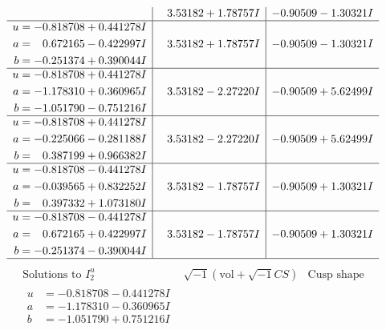 \documentclass[1p]{elsarticle_modified}
\theoremstyle{definition}
\newcommand{\I}{\sqrt{-1}}
\begin{document}
$$\begin{array}{c|c|c}
 & \phantom{-}3.53182 + 1.78757 I & -0.90509 - 1.30321 I \\ \hline\begin{aligned}
u &= -0.818708 + 0.441278 I \\
a &= \phantom{-}0.672165 - 0.422997 I \\
b &= -0.251374 + 0.390044 I\end{aligned}
 & \phantom{-}3.53182 + 1.78757 I & -0.90509 - 1.30321 I \\ \hline\begin{aligned}
u &= -0.818708 + 0.441278 I \\
a &= -1.178310 + 0.360965 I \\
b &= -1.051790 - 0.751216 I\end{aligned}
 & \phantom{-}3.53182 - 2.27220 I & -0.90509 + 5.62499 I \\ \hline\begin{aligned}
u &= -0.818708 + 0.441278 I \\
a &= -0.225066 - 0.281188 I \\
b &= \phantom{-}0.387199 + 0.966382 I\end{aligned}
 & \phantom{-}3.53182 - 2.27220 I & -0.90509 + 5.62499 I \\ \hline\begin{aligned}
u &= -0.818708 - 0.441278 I \\
a &= -0.039565 + 0.832252 I \\
b &= \phantom{-}0.397332 + 1.073180 I\end{aligned}
 & \phantom{-}3.53182 - 1.78757 I & -0.90509 + 1.30321 I \\ \hline\begin{aligned}
u &= -0.818708 - 0.441278 I \\
a &= \phantom{-}0.672165 + 0.422997 I \\
b &= -0.251374 - 0.390044 I\end{aligned}
 & \phantom{-}3.53182 - 1.78757 I & -0.90509 + 1.30321 I\\
 \hline 
 \end{array}$$\newpage$$\begin{array}{c|c|c}  
\text{Solutions to }I^u_{2}& \I (\text{vol} + \sqrt{-1}CS) & \text{Cusp shape}\\
 \hline 
\begin{aligned}
u &= -0.818708 - 0.441278 I \\
a &= -1.178310 - 0.360965 I \\
b &= -1.051790 + 0.751216 I\end{aligned}

\end{array}$$
\end{document}

